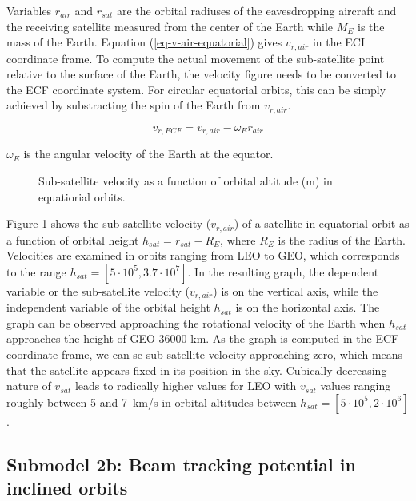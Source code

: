 \documentclass[english, 12pt, a4paper, elec, utf8, a-1b, online]{aaltothesis}
\begin{document}
\noindent
Variables $r_{air}$ and $r_{sat}$ are the orbital radiuses of the eavesdropping aircraft and the receiving satellite measured from the center of the Earth while $M_E$ is the mass of the Earth.
Equation (\ref{eq-v-air-equatorial}) gives $v_{r, air}$ in the ECI coordinate frame.
To compute the actual movement of the sub-satellite point relative to the surface of the Earth, the velocity figure needs to be converted to the ECF coordinate system.
For circular equatorial orbits, this can be simply achieved by substracting the spin of the Earth from $v_{r, air}$.

\begin{equation}
  v_{r, ECF} = v_{r, air} - \omega_E r_{air}
\end{equation}

\noindent
$\omega_E$ is the angular velocity of the Earth at the equator.

\begin{figure}[h]
  \centering
  
  \caption{Sub-satellite velocity as a function of orbital altitude (m) in equatiorial orbits.}
  \label{fig-subsat-velocity-equatiorial}
\end{figure}

Figure \ref{fig-subsat-velocity-equatiorial} shows the sub-satellite velocity ($v_{r, air}$) of a satellite in equatorial orbit as a function of orbital height $h_{sat} = r_{sat} - R_{E}$, where $R_{E}$ is the radius of the Earth.
Velocities are examined in orbits ranging from LEO to GEO, which corresponds to the range $h_{sat} = [5 \cdot 10^5, 3.7 \cdot 10^7]$.
In the resulting graph, the dependent variable or the sub-satellite velocity ($v_{r, air}$) is on the vertical axis, while the independent variable of the orbital height $h_{sat}$ is on the horizontal axis.
The graph can be observed approaching the rotational velocity of the Earth when $h_{sat}$ approaches the height of GEO 36000 km.
As the graph is computed in the ECF coordinate frame, we can se sub-satellite velocity approaching zero, which means that the satellite appears fixed in its position in the sky.
Cubically decreasing nature of $v_{sat}$ leads to radically higher values for LEO with $v_{sat}$ values ranging roughly between 5 and 7\ km/s in orbital altitudes between $h_{sat} = [5 \cdot 10^5, 2 \cdot 10^6]$.

\subsection{Submodel 2b: Beam tracking potential in inclined orbits} \label{ch-results-submodel-2b-tracking-inclined}
\end{document}

